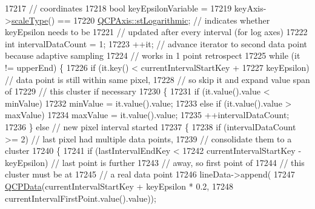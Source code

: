 \begin{DoxyCode}
17217                                                         \textcolor{comment}{// coordinates}
17218       \textcolor{keywordtype}{bool} keyEpsilonVariable =
17219           keyAxis->\hyperlink{class_q_c_p_axis_a8563e13407bc0616da7f7c84e02de170}{scaleType}() ==
17220           \hyperlink{class_q_c_p_axis_a36d8e8658dbaa179bf2aeb973db2d6f0abf5b785ad976618816dc6f79b73216d4}{QCPAxis::stLogarithmic}; \textcolor{comment}{// indicates whether keyEpsilon needs to be}
17221                                   \textcolor{comment}{// updated after every interval (for log axes)}
17222       \textcolor{keywordtype}{int} intervalDataCount = 1;
17223       ++it; \textcolor{comment}{// advance iterator to second data point because adaptive sampling}
17224             \textcolor{comment}{// works in 1 point retrospect}
17225       \textcolor{keywordflow}{while} (it != upperEnd) \{
17226         \textcolor{keywordflow}{if} (it.key() < currentIntervalStartKey +
17227                            keyEpsilon) \textcolor{comment}{// data point is still within same pixel,}
17228                                        \textcolor{comment}{// so skip it and expand value span of}
17229                                        \textcolor{comment}{// this cluster if necessary}
17230         \{
17231           \textcolor{keywordflow}{if} (it.value().value < minValue)
17232             minValue = it.value().value;
17233           \textcolor{keywordflow}{else} \textcolor{keywordflow}{if} (it.value().value > maxValue)
17234             maxValue = it.value().value;
17235           ++intervalDataCount;
17236         \} \textcolor{keywordflow}{else} \textcolor{comment}{// new pixel interval started}
17237         \{
17238           \textcolor{keywordflow}{if} (intervalDataCount >= 2) \textcolor{comment}{// last pixel had multiple data points,}
17239                                       \textcolor{comment}{// consolidate them to a cluster}
17240           \{
17241             \textcolor{keywordflow}{if} (lastIntervalEndKey <
17242                 currentIntervalStartKey - keyEpsilon) \textcolor{comment}{// last point is further}
17243                                                       \textcolor{comment}{// away, so first point of}
17244                                                       \textcolor{comment}{// this cluster must be at}
17245                                                       \textcolor{comment}{// a real data point}
17246               lineData->append(
17247                   \hyperlink{class_q_c_p_data}{QCPData}(currentIntervalStartKey + keyEpsilon * 0.2,
17248                           currentIntervalFirstPoint.value().value));

\end{DoxyCode}
